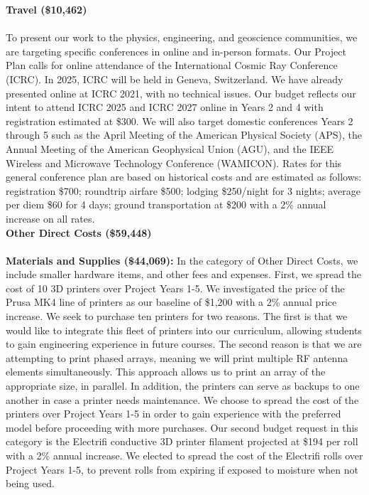 \documentclass[11pt]{amsart}
\begin{document}
\noindent
\textbf{Travel (\$10,462)} \\ \\
To present our work to the physics, engineering, and geoscience communities, we are targeting specific conferences in online and in-person formats. Our Project Plan calls for online attendance of the International Cosmic Ray Conference (ICRC). In 2025, ICRC will be held in Geneva, Switzerland. We have already presented online at ICRC 2021, with no technical issues. Our budget reflects our intent to attend ICRC 2025 and ICRC 2027 online in Years 2 and 4 with registration estimated at \$300. We will also target domestic conferences Years 2 through 5 such as the April Meeting of the American Physical Society (APS), the Annual Meeting of the American Geophysical Union (AGU), and the IEEE Wireless and Microwave Technology Conference (WAMICON). Rates for this general conference plan are based on historical costs and are estimated as follows: registration \$700; roundtrip airfare \$500; lodging \$250/night for 3 nights; average per diem \$60 for 4 days; ground transportation at \$200 with a 2\% annual increase on all rates. \\

\noindent
\textbf{Other Direct Costs (\$59,448)} \\ \\
\textbf{Materials and Supplies (\$44,069):} In the category of Other Direct Costs, we include smaller hardware items, and other fees and expenses. First, we spread the cost of 10 3D printers over Project Years 1-5. We investigated the price of the Prusa MK4 line of printers as our baseline of \$1,200 with a 2\% annual price increase. We seek to purchase ten printers for two reasons. The first is that we would like to integrate this fleet of printers into our curriculum, allowing students to gain engineering experience in future courses. The second reason is that we are attempting to print phased arrays, meaning we will print multiple RF antenna elements simultaneously. This approach allows us to print an array of the appropriate size, in parallel. In addition, the printers can serve as backups to one another in case a printer needs maintenance. We choose to spread the cost of the printers over Project Years 1-5 in order to gain experience with the preferred model before proceeding with more purchases. Our second budget request in this category is the Electrifi conductive 3D printer filament projected at \$194 per roll with a 2\% annual increase. We elected to spread the cost of the Electrifi rolls over Project Years 1-5, to prevent rolls from expiring if exposed to moisture when not being used. \\
\end{document}
